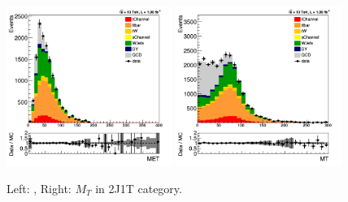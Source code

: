 \begin{figure}[!Hhtb]
  \begin{center}
    \includegraphics[width=0.48\textwidth]{figures/2J1T/MET.png}
    \includegraphics[width=0.48\textwidth]{figures/2J1T/MT.png}
    \caption{\label{fig:2J1TMETMT}{Left: \MET, Right: $M_T$ in 2J1T category.}}
  \end{center}
\end{figure}



